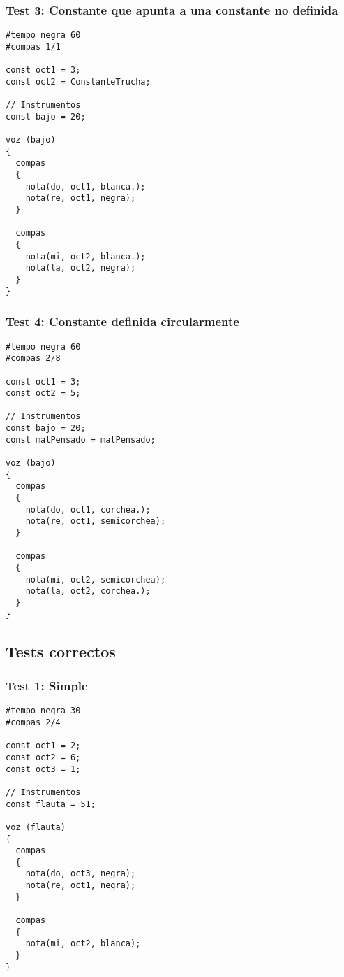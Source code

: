 \subsubsection{Test 3: Constante que apunta a una constante no definida}

\begin{lstlisting}
#tempo negra 60
#compas 1/1

const oct1 = 3;
const oct2 = ConstanteTrucha;

// Instrumentos
const bajo = 20;

voz (bajo)
{
  compas
  {
    nota(do, oct1, blanca.);
    nota(re, oct1, negra);
  }

  compas
  {
    nota(mi, oct2, blanca.);
    nota(la, oct2, negra);
  }
}
\end{lstlisting}
\vspace{5mm}

\subsubsection{Test 4: Constante definida circularmente}

\begin{lstlisting}
#tempo negra 60
#compas 2/8

const oct1 = 3;
const oct2 = 5;

// Instrumentos
const bajo = 20;
const malPensado = malPensado;

voz (bajo)
{
  compas
  {
    nota(do, oct1, corchea.);
    nota(re, oct1, semicorchea);
  }

  compas
  {
    nota(mi, oct2, semicorchea);
    nota(la, oct2, corchea.);
  }
}
\end{lstlisting}
\vspace{5mm}

\subsection{Tests correctos}

\subsubsection{Test 1: Simple}

\begin{lstlisting}
#tempo negra 30
#compas 2/4

const oct1 = 2;
const oct2 = 6;
const oct3 = 1;

// Instrumentos
const flauta = 51;

voz (flauta)
{
  compas
  {
    nota(do, oct3, negra);
    nota(re, oct1, negra);
  }

  compas
  {
    nota(mi, oct2, blanca);
  }
}
\end{lstlisting}
\vspace{5mm}

